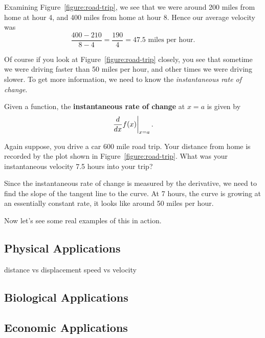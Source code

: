 \begin{solution}
Examining Figure~\ref{figure:road-trip}, we see that we were around
200 miles from home at hour 4, and 400 miles from home at hour 8. Hence our average velocity was 
\[
\frac{400-210}{8-4} = \frac{190}{4} = 47.5 \text{ miles per hour.}
\]
\end{solution}

Of course if you look at Figure~\ref{figure:road-trip} closely, you
see that sometime we were driving faster than 50 miles per hour, and
other times we were driving slower. To get more information, we need
to know the \textit{instantaneous rate of change}.

\begin{definition}
Given a function, the \textbf{instantaneous rate of change} at $x=a$ is given by
\[
\left.\frac{d}{dx} f(x) \right|_{x=a}.
\] 
\end{definition}

\begin{example} 
Again suppose, you drive a car 600 mile road trip. Your distance from
home is recorded by the plot shown in
Figure~\ref{figure:road-trip}. What was your instantaneous velocity
7.5 hours into your trip?
\end{example}
\begin{solution}
Since the instantaneous rate of change is measured by the derivative,
we need to find the slope of the tangent line to the curve. At 7
hours, the curve is growing at an essentially constant rate, it looks
like around 50 miles per hour.
\end{solution}

Now let's see some real examples of this in action.


\subsection*{Physical Applications}

distance vs displacement
speed vs velocity


\subsection*{Biological Applications}



\subsection*{Economic Applications}

